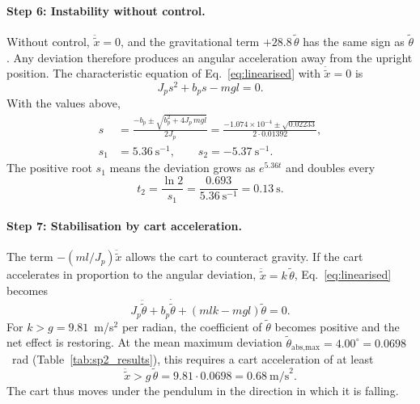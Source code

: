 \documentclass[11pt,a4paper]{article}
\begin{document}
\paragraph{Step 6: Instability without control.}
Without control, $\ddot{\tilde{x}} = 0$, and the gravitational term $+28.8\,\tilde{\theta}$ has the same sign as $\tilde{\theta}$.
Any deviation therefore produces an angular acceleration away from the upright position.
The characteristic equation of Eq.~\eqref{eq:linearised} with $\ddot{\tilde{x}} = 0$ is
\begin{equation}
J_p s^2 + b_p s - mgl = 0.
\label{eq:char}
\end{equation}
With the values above,
\begin{align*}
s &= \frac{-b_p \pm \sqrt{b_p^2 + 4J_p\,mgl}}{2J_p}
= \frac{-1.074\times10^{-4} \pm \sqrt{0.02233}}{2 \cdot 0.01392}, \\
s_1 &= 5.36~\text{s}^{-1}, \qquad s_2 = -5.37~\text{s}^{-1}.
\end{align*}
The positive root $s_1$ means the deviation grows as $e^{5.36t}$ and doubles every
\begin{equation*}
t_2 = \frac{\ln 2}{s_1} = \frac{0.693}{5.36~\text{s}^{-1}} = 0.13~\text{s}.
\end{equation*}

\paragraph{Step 7: Stabilisation by cart acceleration.}
The term $-\left(ml/J_p\right)\ddot{\tilde{x}}$ allows the cart to counteract gravity.
If the cart accelerates in proportion to the angular deviation, $\ddot{\tilde{x}} = k\,\tilde{\theta}$, Eq.~\eqref{eq:linearised} becomes
\begin{equation}
J_p\ddot{\tilde{\theta}} + b_p\dot{\tilde{\theta}} + \left(mlk - mgl\right)\tilde{\theta} = 0.
\label{eq:controlled}
\end{equation}
For $k > g = 9.81$~m/s$^2$ per radian, the coefficient of $\tilde{\theta}$ becomes positive and the net effect is restoring.
At the mean maximum deviation $\tilde{\theta}_\text{abs,max} = 4.00^\circ = 0.0698$~rad (Table~\ref{tab:sp2_results}), this requires a cart acceleration of at least
\begin{equation*}
\ddot{\tilde{x}} > g\,\tilde{\theta} = 9.81 \cdot 0.0698 = 0.68~\text{m/s}^2.
\end{equation*}
The cart thus moves under the pendulum in the direction in which it is falling.
\end{document}
